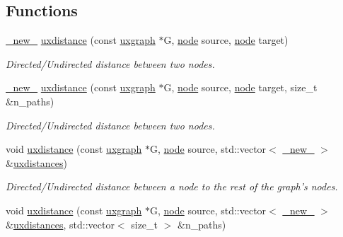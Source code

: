 \subsection*{Functions}
\begin{DoxyCompactItemize}
\item 
\hyperlink{namespacelgraph_a2836f966c1c36b43da337d8907728ec0}{\-\_\-new\-\_\-} \hyperlink{namespacelgraph_1_1traversal_a73bb6b5984fc97e12576ca4f16344fbf}{uxdistance} (const \hyperlink{classlgraph_1_1uxgraph}{uxgraph} $\ast$G, \hyperlink{namespacelgraph_a397169dd66adf725210a30fb7251773e}{node} source, \hyperlink{namespacelgraph_a397169dd66adf725210a30fb7251773e}{node} target)
\begin{DoxyCompactList}\small\item\em Directed/\-Undirected distance between two nodes. \end{DoxyCompactList}\item 
\hyperlink{namespacelgraph_a2836f966c1c36b43da337d8907728ec0}{\-\_\-new\-\_\-} \hyperlink{namespacelgraph_1_1traversal_a084aa7ff13d10613c411ff8d4a2dc4c8}{uxdistance} (const \hyperlink{classlgraph_1_1uxgraph}{uxgraph} $\ast$G, \hyperlink{namespacelgraph_a397169dd66adf725210a30fb7251773e}{node} source, \hyperlink{namespacelgraph_a397169dd66adf725210a30fb7251773e}{node} target, size\-\_\-t \&n\-\_\-paths)
\begin{DoxyCompactList}\small\item\em Directed/\-Undirected distance between two nodes. \end{DoxyCompactList}\item 
void \hyperlink{namespacelgraph_1_1traversal_a43974cb7096893f50511d745c8993cf0}{uxdistance} (const \hyperlink{classlgraph_1_1uxgraph}{uxgraph} $\ast$G, \hyperlink{namespacelgraph_a397169dd66adf725210a30fb7251773e}{node} source, std\-::vector$<$ \hyperlink{namespacelgraph_a2836f966c1c36b43da337d8907728ec0}{\-\_\-new\-\_\-} $>$ \&\hyperlink{namespacelgraph_1_1traversal_a401cf82c5e153e82a73f4be9d5d75288}{uxdistances})
\begin{DoxyCompactList}\small\item\em Directed/\-Undirected distance between a node to the rest of the graph's nodes. \end{DoxyCompactList}\item 
void \hyperlink{namespacelgraph_1_1traversal_a1b00d5986cab46bf5cfaad0259886a72}{uxdistance} (const \hyperlink{classlgraph_1_1uxgraph}{uxgraph} $\ast$G, \hyperlink{namespacelgraph_a397169dd66adf725210a30fb7251773e}{node} source, std\-::vector$<$ \hyperlink{namespacelgraph_a2836f966c1c36b43da337d8907728ec0}{\-\_\-new\-\_\-} $>$ \&\hyperlink{namespacelgraph_1_1traversal_a401cf82c5e153e82a73f4be9d5d75288}{uxdistances}, std\-::vector$<$ size\-\_\-t $>$ \&n\-\_\-paths)

\end{DoxyCompactItemize}
